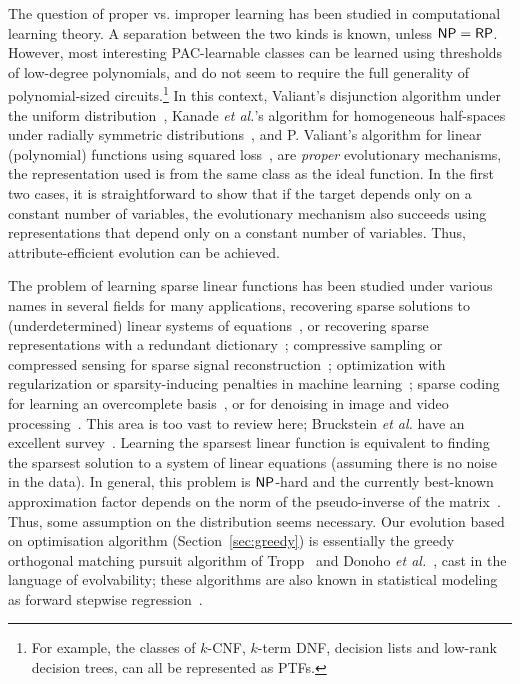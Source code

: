 The question of proper vs. improper learning has been studied in computational
learning theory. A separation between the two kinds is known, unless $\mathsf{NP} =
\mathsf{RP}$. However, most interesting PAC-learnable classes can be learned using
thresholds of low-degree polynomials, and do not seem to require the full
generality of polynomial-sized circuits.\footnote{For example, the classes of
$k$-CNF, $k$-term DNF, decision lists and low-rank decision trees, can all be
represented as PTFs.} In this context, Valiant's disjunction algorithm under the
uniform distribution~\cite{Valiant:2009-evolvability}, Kanade {\it et al.}'s
algorithm for homogeneous half-spaces under radially symmetric
distributions~\cite{KVV:2010-drift}, and P. Valiant's algorithm for linear
(polynomial) functions using squared loss~\cite{Valiant:2012-real}, are
\emph{proper} evolutionary mechanisms, \ie the representation used is from the
same class as the ideal function.  In the first two cases, it is straightforward
to show that if the target depends only on a constant number of variables, the
evolutionary mechanism also succeeds using representations that depend only on a
constant number of variables. Thus, attribute-efficient evolution can be
achieved.

The problem of learning sparse linear functions has been studied under various
names in several fields for many applications, \eg recovering sparse solutions
to (underdetermined) linear systems of equations~\cite{Donoho:2009-sparse}, or
recovering sparse representations with a redundant
dictionary~\cite{Mallat:2008,Elad:2010}; compressive sampling or compressed
sensing for sparse signal reconstruction~\cite{Candes:2008}; optimization with
regularization or sparsity-inducing penalties in machine
learning~\cite{Bach:2012}; sparse coding for learning an overcomplete
basis~\cite{Olshausen:1997}, or for denoising in image and video
processing~\cite{Elad:2010}. This area is too vast to review here; Bruckstein
\emph{et al.} have an excellent survey~\cite{Donoho:2009-sparse}.  Learning the
sparsest linear function is equivalent to finding the sparsest solution to a
system of linear equations (assuming there is no noise in the data). In general,
this problem is $\mathsf{NP}$-hard and the currently best-known approximation factor
depends on the norm of the pseudo-inverse of the matrix~\cite{Natarajan:1995}.
Thus, some assumption on the distribution seems necessary. Our evolution based
on optimisation algorithm (Section~\ref{sec:greedy}) is essentially the greedy
orthogonal matching pursuit algorithm of Tropp~\cite{Tropp:2004-greed} and
Donoho \emph{et al.}~\cite{Donoho:2006-recovery}, cast in the language of
evolvability; these algorithms are also known in statistical modeling as forward
stepwise regression~\cite{Daniel:1999,Hastie:2001}.

